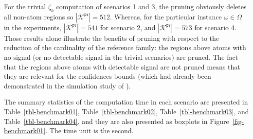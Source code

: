 \documentclass[
  11pt,
  a4paper,
]{article}
\theoremstyle{plain}
\theoremstyle{definition}
\theoremstyle{plain}
\theoremstyle{definition}
\theoremstyle{plain}
\theoremstyle{remark}
\begin{document}
For the trivial \(\zeta_k\) computation of scenarios 1 and 3, the
pruning obviously deletes all non-atom regions so
\(|\mathcal{K}^{\mathfrak{pr}}|=512\). Whereas, for the particular
instance \(\omega\in\Omega\) in the experiments,
\(|\mathcal{K}^{\mathfrak{pr}}|=541\) for scenario 2, and
\(|\mathcal{K}^{\mathfrak{pr}}|=573\) for scenario 4. Those results
alone illustrate the benefits of pruning with respect to the reduction
of the cardinality of the reference family: the regions above atoms with
no signal (or no detectable signal in the trivial scenarios) are pruned.
The fact that the regions above atoms with detectable signal are not
pruned means that they are relevant for the confidences bounds (which
had already been demonstrated in the simulation study of
\citet{MR4178188}).

The summary statistics of the computation time in each scenario are
presented in Table~\ref{tbl-benchmark01}, Table~\ref{tbl-benchmark02},
Table~\ref{tbl-benchmark03}, and Table~\ref{tbl-benchmark04}, and they
are also presented as boxplots in Figure~\ref{fig-benchmark01}. The time
unit is the second.
\end{document}
